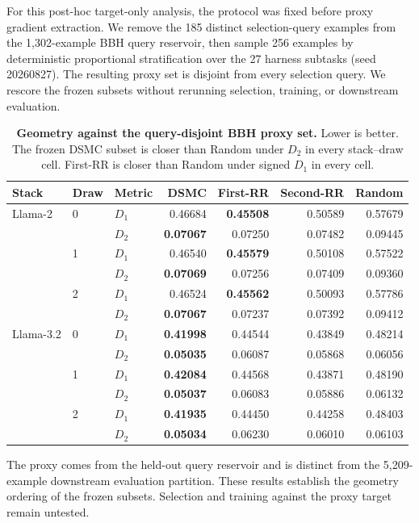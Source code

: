 \documentclass{article}
\newcommand{\method}{\textsc{DSMC}}
\begin{document}
For this post-hoc target-only analysis, the protocol was fixed before proxy
gradient extraction. We remove the 185 distinct selection-query examples from
the 1,302-example BBH query reservoir, then sample 256 examples by deterministic
proportional stratification over the 27 harness subtasks (seed 20260827). The
resulting proxy set is disjoint from every selection query. We rescore the
frozen subsets without rerunning selection, training, or downstream evaluation.

\begin{table}[h]
\caption{\textbf{Geometry against the query-disjoint BBH proxy set.}
Lower is better. The frozen \method{} subset is closer than Random under
$D_2$ in every stack--draw cell. First-RR is closer than Random under signed
$D_1$ in every cell.}
\label{tab:proxy_geometry}
\centering
\small
\begin{tabular}{lllrrrr}
\toprule
Stack & Draw & Metric & \method{} & First-RR & Second-RR & Random \\
\midrule
Llama-2 & 0 & $D_1$ & 0.46684 & \textbf{0.45508} & 0.50589 & 0.57679 \\
        &   & $D_2$ & \textbf{0.07067} & 0.07250 & 0.07482 & 0.09445 \\
        & 1 & $D_1$ & 0.46540 & \textbf{0.45579} & 0.50108 & 0.57522 \\
        &   & $D_2$ & \textbf{0.07069} & 0.07256 & 0.07409 & 0.09360 \\
        & 2 & $D_1$ & 0.46524 & \textbf{0.45562} & 0.50093 & 0.57786 \\
        &   & $D_2$ & \textbf{0.07067} & 0.07237 & 0.07392 & 0.09412 \\
\midrule
Llama-3.2 & 0 & $D_1$ & \textbf{0.41998} & 0.44544 & 0.43849 & 0.48214 \\
          &   & $D_2$ & \textbf{0.05035} & 0.06087 & 0.05868 & 0.06056 \\
          & 1 & $D_1$ & \textbf{0.42084} & 0.44568 & 0.43871 & 0.48190 \\
          &   & $D_2$ & \textbf{0.05037} & 0.06083 & 0.05886 & 0.06132 \\
          & 2 & $D_1$ & \textbf{0.41935} & 0.44450 & 0.44258 & 0.48403 \\
          &   & $D_2$ & \textbf{0.05034} & 0.06230 & 0.06010 & 0.06103 \\
\bottomrule
\end{tabular}
\end{table}

The proxy comes from the held-out query reservoir and is distinct from the
5,209-example downstream evaluation partition. These results establish the
geometry ordering of the frozen subsets. Selection and training against the
proxy target remain untested.
\end{document}
